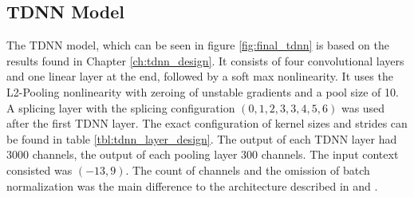 \subsection{TDNN Model}
The TDNN model, which can be seen in figure \ref{fig:final_tdnn} is based on the results found in Chapter \ref{ch:tdnn_design}. It consists of four convolutional layers and one linear layer at the end, followed by a soft max nonlinearity. It uses the L2-Pooling nonlinearity with zeroing of unstable gradients and a pool size of 10. A splicing layer with the splicing configuration $(0, 1, 2, 3, 3, 4, 5, 6)$ was used after the first TDNN layer. The exact configuration of kernel sizes and strides can be found in table \ref{tbl:tdnn_layer_design}. The output of each TDNN layer had 3000 channels, the output of each pooling layer 300 channels. The input context consisted was $(-13, 9)$. The count of channels and the omission of batch normalization was the main difference to the architecture described in \cite{peddinti2015reverberation} and \cite{peddinti2015jhu}. \\ \\
